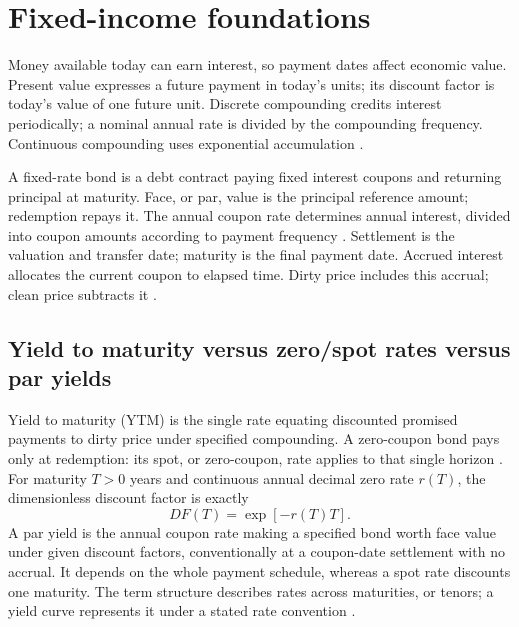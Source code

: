 \chapter{Fixed-income foundations}\label{ch:foundations}
\label{sec:present-value}\label{sec:compounding}
Money available today can earn interest, so payment dates affect economic value. Present value expresses a future payment in today's units; its discount factor is today's value of one future unit. Discrete compounding credits interest periodically; a nominal annual rate is divided by the compounding frequency. Continuous compounding uses exponential accumulation \parencite{tuckman2011}.

\label{sec:contract}\label{sec:dates}\label{sec:price-quotation}
A fixed-rate bond is a debt contract paying fixed interest coupons and returning principal at maturity. Face, or par, value is the principal reference amount; redemption repays it. The annual coupon rate determines annual interest, divided into coupon amounts according to payment frequency \parencite{tuckman2011}. Settlement is the valuation and transfer date; maturity is the final payment date. Accrued interest allocates the current coupon to elapsed time. Dirty price includes this accrual; clean price subtracts it \parencite{tuckman2011}.

\section{Yield to maturity versus zero/spot rates versus par yields}\label{sec:zero-par}\label{sec:ytm-concept}\label{sec:term-structure}
Yield to maturity (YTM) is the single rate equating discounted promised payments to dirty price under specified compounding. A zero-coupon bond pays only at redemption: its spot, or zero-coupon, rate applies to that single horizon \parencite{tuckman2011}. For maturity \(T>0\) years and continuous annual decimal zero rate \(r(T)\), the dimensionless discount factor is exactly
\begin{equation}\label{eq:discount}
DF(T)=\exp[-r(T)T].
\end{equation}
A par yield is the annual coupon rate making a specified bond worth face value under given discount factors, conventionally at a coupon-date settlement with no accrual. It depends on the whole payment schedule, whereas a spot rate discounts one maturity. The term structure describes rates across maturities, or tenors; a yield curve represents it under a stated rate convention \parencite{tuckman2011}.

